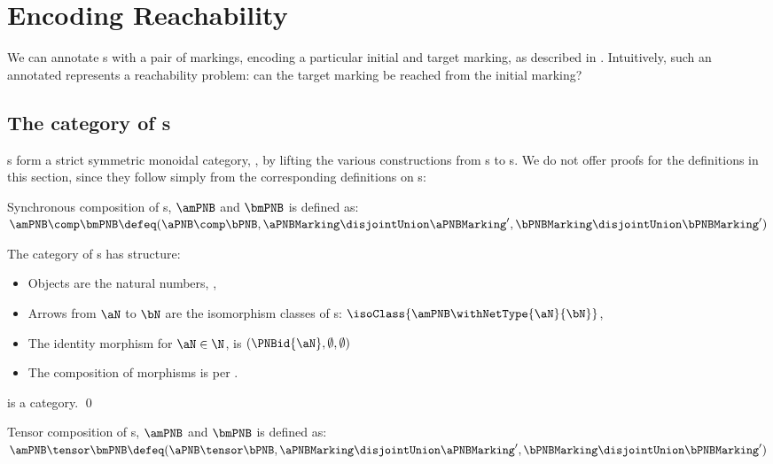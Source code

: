 \section{Encoding Reachability}

We can annotate \PNB{}s with a pair of markings, encoding a particular initial
and target marking, as described in . Intuitively, such
an annotated \PNB{} represents a reachability problem: can the target marking
be reached from the initial marking?

\subsection{The category of \mPNB{}s}

\mPNB{}s form a strict symmetric monoidal category, \mPNBCat, by lifting the
various constructions from \PNB{}s to \mPNB{}s. We do not offer proofs for the
definitions in this section, since they follow simply from the corresponding
definitions on \PNB{}s:

\begin{definition}\label{defn:mPNBComp}
    Synchronous composition of \mPNB{}s, $\amPNB$ and $\bmPNB$ is defined as:
    $\amPNB \comp \bmPNB \defeq (\aPNB \comp \bPNB,
    \aPNBMarking \disjointUnion \aPNBMarking',
    \bPNBMarking \disjointUnion \bPNBMarking')$
\end{definition}

The category of \mPNB{}s has structure:

\begin{itemize}
\item Objects are the natural numbers, \N,
\item Arrows from $\aN$ to $\bN$ are the isomorphism classes of \mPNB{}s:
    $\isoClass{\amPNB \withNetType{\aN}{\bN}}$,
\item The identity morphism for $\aN \in \N$, is
    $(\PNBid{\aN}, \emptyset, \emptyset)$
\item The composition of morphisms is per .
\end{itemize}

\begin{proposition}
    \mPNBCat{} is a category. \qed
\end{proposition}

\begin{definition}\label{defn:mPNBTensor}
    Tensor composition of \mPNB{}s, $\amPNB$ and $\bmPNB$ is defined as:
    $\amPNB \tensor \bmPNB \defeq (\aPNB \tensor \bPNB,
    \aPNBMarking \disjointUnion \aPNBMarking',
    \bPNBMarking \disjointUnion \bPNBMarking')$
\end{definition}

